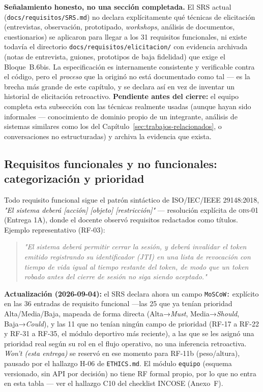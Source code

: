 \documentclass[11pt,a4paper]{article}
\newcommand{\ruta}[1]{\texttt{\footnotesize #1}}
\begin{document}
\textbf{Señalamiento honesto, no una sección completada.} El SRS actual
(\ruta{docs/requisitos/SRS.md}) no declara explícitamente qué técnicas de
elicitación (entrevistas, observación, prototipado, \emph{workshops},
análisis de documentos, cuestionarios) se aplicaron para llegar a los 31
requisitos funcionales, ni existe todavía el directorio
\ruta{docs/requisitos/elicitacion/} con evidencia archivada (notas de
entrevista, guiones, prototipos de baja fidelidad) que exige el
Bloque~B.6bis. La especificación es internamente consistente y
verificable contra el código, pero el \emph{proceso} que la originó no
está documentado como tal — es la brecha más grande de este capítulo, y
se declara así en vez de inventar un historial de elicitación
retroactivo. \textbf{Pendiente antes del cierre:} el equipo completa esta
subsección con las técnicas realmente usadas (aunque hayan sido
informales — conocimiento de dominio propio de un integrante, análisis de
sistemas similares como los del Capítulo~\ref{sec:trabajos-relacionados},
o conversaciones no estructuradas) y archiva la evidencia que exista.

\subsection{Requisitos funcionales y no funcionales: categorización y prioridad}

Todo requisito funcional sigue el patrón sintáctico de
ISO/IEC/IEEE 29148:2018, \emph{"El sistema deberá [acción] [objeto]
[restricción]"} — resolución explícita de \textsc{obs-01} (Entrega 1A),
donde el docente observó requisitos redactados como títulos. Ejemplo
representativo (RF-03):

\begin{quote}
\itshape "El sistema deberá permitir cerrar la sesión, y deberá invalidar
el token emitido registrando su identificador (JTI) en una lista de
revocación con tiempo de vida igual al tiempo restante del token, de modo
que un token robado antes del cierre de sesión no siga siendo aceptado."
\end{quote}

\textbf{Actualización (2026-09-04):} el SRS declara ahora un campo
\texttt{MoSCoW:} explícito en las 36 entradas de requisito funcional
—las 25 que ya tenían prioridad Alta/Media/Baja, mapeada de forma
directa (Alta→\emph{Must}, Media→\emph{Should}, Baja→\emph{Could}), y
las 11 que no tenían ningún campo de prioridad (RF-17 a RF-22 y RF-31 a
RF-35, el módulo deportivo más reciente), a las que se les asignó una
prioridad real según su rol en el flujo operativo, no una inferencia
retroactiva. \emph{Won't (esta entrega)} se reservó en ese momento para
RF-11b (peso/altura), pausado por el hallazgo H-06 de \ruta{ETHICS.md}.
El módulo \texttt{equipo} (esquema versionado, sin API por decisión) no
tiene RF formal propio, por lo que no entra en esta tabla — ver el
hallazgo C10 del checklist INCOSE (Anexo~F).
\end{document}
